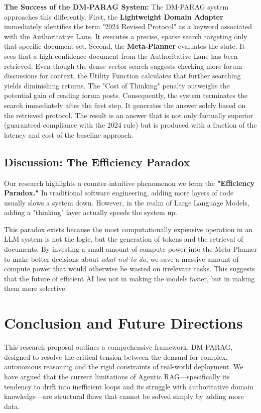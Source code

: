 \documentclass[12pt,en]{elegantpaper}
\begin{document}
\textbf{The Success of the DM-PARAG System:}
The DM-PARAG system approaches this differently. 
First, the \textbf{Lightweight Domain Adapter} immediately identifies the term "2024 Revised Protocol" as a keyword associated with the Authoritative Lane. It executes a precise, sparse search targeting only that specific document set.
Second, the \textbf{Meta-Planner} evaluates the state. It sees that a high-confidence document from the Authoritative Lane has been retrieved. Even though the dense vector search suggests checking more forum discussions for context, the Utility Function calculates that further searching yields diminishing returns. The "Cost of Thinking" penalty outweighs the potential gain of reading forum posts.
Consequently, the system terminates the search immediately after the first step. It generates the answer solely based on the retrieved protocol. The result is an answer that is not only factually superior (guaranteed compliance with the 2024 rule) but is produced with a fraction of the latency and cost of the baseline approach.

\subsection{Discussion: The Efficiency Paradox}

Our research highlights a counter-intuitive phenomenon we term the \textbf{"Efficiency Paradox."} In traditional software engineering, adding more layers of code usually slows a system down. However, in the realm of Large Language Models, adding a "thinking" layer actually speeds the system up. 

This paradox exists because the most computationally expensive operation in an LLM system is not the logic, but the generation of tokens and the retrieval of documents. By investing a small amount of compute power into the Meta-Planner to make better decisions about \textit{what not to do}, we save a massive amount of compute power that would otherwise be wasted on irrelevant tasks. This suggests that the future of efficient AI lies not in making the models faster, but in making them more selective.

\section{Conclusion and Future Directions}

This research proposal outlines a comprehensive framework, DM-PARAG, designed to resolve the critical tension between the demand for complex, autonomous reasoning and the rigid constraints of real-world deployment. We have argued that the current limitations of Agentic RAG—specifically its tendency to drift into inefficient loops and its struggle with authoritative domain knowledge—are structural flaws that cannot be solved simply by adding more data.
\end{document}

